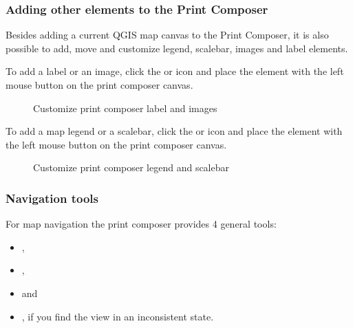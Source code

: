 \subsubsection{Adding other elements to the Print Composer} 

Besides adding a current QGIS map canvas to the Print Composer, it is also possible 
to add, move and customize legend, scalebar, images and label elements.


To add a label or an image, click the  or 
 icon and place the element 
with the left mouse button on the print composer canvas.

\begin{figure}[ht]
\centering
\caption{Customize print composer label and images \nixcaption}\label{fig:print_composer_tab2}
   \goodgap
\end{figure}


To add a map legend or a scalebar, click the  or 
 icon and place the element with the left 
mouse button on the print composer canvas.

\begin{figure}[ht]
\centering
\caption{Customize print composer legend and scalebar \nixcaption}\label{fig:print_composer_tab1}
   \goodgap
\end{figure}

\subsubsection{Navigation tools}

For map navigation the print composer provides 4 general tools:

\begin{itemize}
\item {},
\item {},
\item {} and
\item {}, if you find the view in an inconsistent state. 
\end{itemize}

